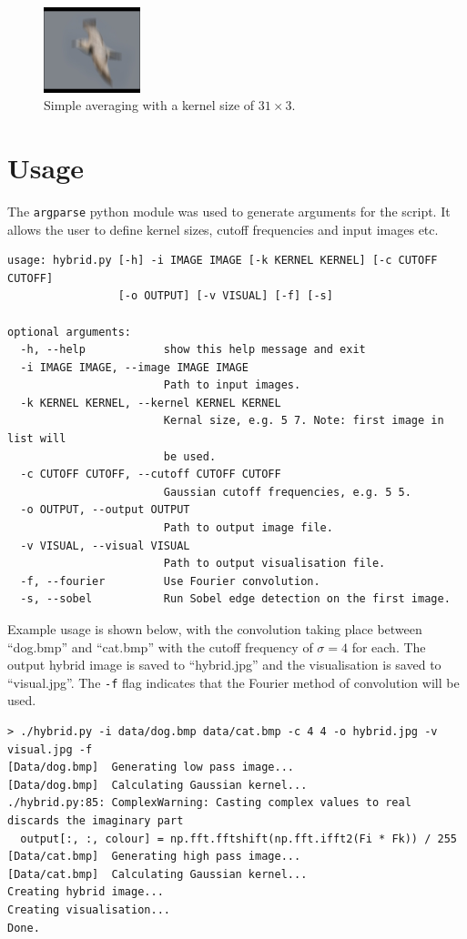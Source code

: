 \documentclass[a4paper]{article}
\begin{document}
\begin{figure}[!htbp]
    \centering
    \includegraphics[width=0.25\textwidth]{../arb}
    \caption{Simple averaging with a kernel size of $31\times 3$.}
    \label{fig:arb-kern}
\end{figure}

\section{Usage}
The \texttt{argparse} python module was used to generate arguments for the script. It allows the user to define kernel sizes, cutoff frequencies and input images etc.

\begin{verbatim}
usage: hybrid.py [-h] -i IMAGE IMAGE [-k KERNEL KERNEL] [-c CUTOFF CUTOFF]
                 [-o OUTPUT] [-v VISUAL] [-f] [-s]

optional arguments:
  -h, --help            show this help message and exit
  -i IMAGE IMAGE, --image IMAGE IMAGE
                        Path to input images.
  -k KERNEL KERNEL, --kernel KERNEL KERNEL
                        Kernal size, e.g. 5 7. Note: first image in list will
                        be used.
  -c CUTOFF CUTOFF, --cutoff CUTOFF CUTOFF
                        Gaussian cutoff frequencies, e.g. 5 5.
  -o OUTPUT, --output OUTPUT
                        Path to output image file.
  -v VISUAL, --visual VISUAL
                        Path to output visualisation file.
  -f, --fourier         Use Fourier convolution.
  -s, --sobel           Run Sobel edge detection on the first image.
\end{verbatim}

Example usage is shown below, with the convolution taking place between ``dog.bmp'' and ``cat.bmp'' with the cutoff frequency of $\sigma=4$ for each. The output hybrid image is saved to ``hybrid.jpg'' and the visualisation is saved to ``visual.jpg''. The \texttt{-f} flag indicates that the Fourier method of convolution will be used.

\begin{verbatim}
> ./hybrid.py -i data/dog.bmp data/cat.bmp -c 4 4 -o hybrid.jpg -v visual.jpg -f
[Data/dog.bmp]	Generating low pass image...
[Data/dog.bmp]	Calculating Gaussian kernel...
./hybrid.py:85: ComplexWarning: Casting complex values to real discards the imaginary part
  output[:, :, colour] = np.fft.fftshift(np.fft.ifft2(Fi * Fk)) / 255
[Data/cat.bmp]	Generating high pass image...
[Data/cat.bmp]	Calculating Gaussian kernel...
Creating hybrid image...
Creating visualisation...
Done.
\end{verbatim}
\end{document}
